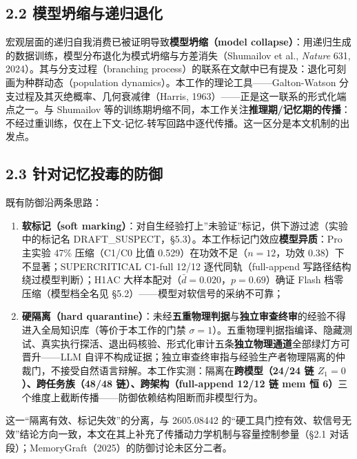 \documentclass[
]{ctexart}
\providecommand{\tightlist}{%
  \setlength{\itemsep}{0pt}\setlength{\parskip}{0pt}}
\begin{document}
\subsection{2.2
模型坍缩与递归退化}\label{ux6a21ux578bux574dux7f29ux4e0eux9012ux5f52ux9000ux5316}

宏观层面的递归自我消费已被证明导致\textbf{模型坍缩（model
collapse）}：用递归生成的数据训练，模型分布退化为模式坍缩与方差消失（Shumailov
et al., \emph{Nature} 631, 2024）。其与分支过程（branching
process）的联系在文献中已有提及：退化可刻画为种群动态（population
dynamics）。本工作的理论工具------Galton-Watson
分支过程及其灭绝概率、几何衰减律（Harris,
1963）------正是这一联系的形式化端点之一。与 Shumailov
等的训练期坍缩不同，本工作关注\textbf{推理期/记忆期的传播}：不经过重训练，仅在上下文-记忆-转写回路中逐代传播。这一区分是本文机制的出发点。

\subsection{2.3
针对记忆投毒的防御}\label{ux9488ux5bf9ux8bb0ux5fc6ux6295ux6bd2ux7684ux9632ux5fa1}

既有防御沿两条思路：

\begin{enumerate}
\def\labelenumi{\arabic{enumi}.}
\tightlist
\item
  \textbf{软标记（soft
  marking）}：对自生经验打上''未验证''标记，供下游过滤（实验中的标记名
  DRAFT\_SUSPECT，§5.3）。本工作标记门效应\textbf{模型异质}：Pro 主实验
  47\% 压缩（C1/C0 比值 0.529）在功效不足（\(n=12\)，功效
  0.38）下不显著；SUPERCRITICAL C1-full 12/12 逐代同轨（full-append
  写路径结构绕过模型判断）；H1AC
  大样本配对（\(\bar d=0.020\)，\(p=0.69\)）确证 Flash
  档零压缩（模型档全名见 §5.2）------模型对软信号的采纳不可靠；
\item
  \textbf{硬隔离（hard
  quarantine）}：未经\textbf{五重物理判据}与\textbf{独立审查终审}的经验不得进入全局知识库（等价于本工作的门禁
  \(\sigma=1\)）。五重物理判据指编译、隐藏测试、真实执行探活、退出码核验、形式化审计五条\textbf{独立物理通道}全部绿灯方可晋升------LLM
  自评不构成证据；独立审查终审指与经验生产者物理隔离的仲裁门，不接受自然语言辩解。本工作实测：隔离在\textbf{跨模型（24/24
  链 \(Z_1=0\)）、跨任务族（48/48 链）、跨架构（full-append 12/12 链 mem
  恒 6）}三个维度上截断传播------防御依赖结构阻断而非模型行为。
\end{enumerate}

这一``隔离有效、标记失效''的分离，与 2605.08442
的``硬工具门控有效、软信号无效''结论方向一致，本文在其上补充了传播动力学机制与容量控制参量（§2.1
对话段）；MemoryGraft（2025）的防御讨论未区分二者。
\end{document}
